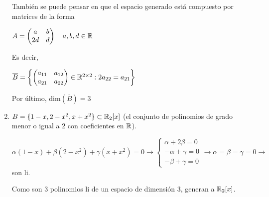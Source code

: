 \begin{enumerate}
\begin{mdframed}[style=s]
\begin{center}
                \end{center}
                También se puede pensar en que el espacio generado está compuesto por matrices de la forma
                \begin{center}
                    $A=\begin{pmatrix}
                        a&b\\2d&d
                    \end{pmatrix}\quad a,b,d\in\mathbb{R}$
                \end{center}
                Es decir, 
                \begin{center}
                    $\overline{B}=\left\{\begin{pmatrix}
                        a_{11}&a_{12}\\a_{21}&a_{22}
                    \end{pmatrix}\in\mathbb{R}^{2\times2}:2a_{22}=a_{21}\right\}$    
                \end{center}
                Por último, dim$(\overline{B})=3$
            \end{mdframed}
        \item $B=\{1-x,2-x^2,x+x^2\}\subset\mathbb{R}_2[x]$ (el conjunto de polinomios de grado menor o igual a 2 con coeficientes en $\mathbb{R}$).
            \begin{mdframed}[style=s]
                \begin{center}
                    $\alpha(1-x)+\beta(2-x^2)+\gamma(x+x^2)=0\to\begin{cases}
                        \alpha+2\beta=0\\
                        -\alpha+\gamma=0\\
                        -\beta+\gamma=0
                    \end{cases}\to \alpha=\beta=\gamma=0\to$ son li.
                \end{center}
                Como son 3 polinomios li de un espacio de dimensión 3, generan a $\mathbb{R}_2[x]$.
            \end{mdframed}
    \end{enumerate}
    